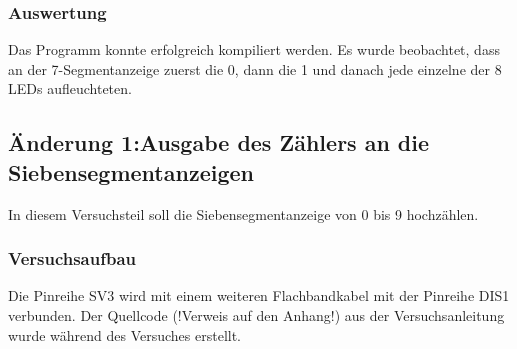 \documentclass[12pt,a4paper]{article}
\begin{document}
\subsubsection*{Auswertung}
Das Programm konnte erfolgreich kompiliert werden. Es wurde beobachtet, dass an der 7-Segmentanzeige zuerst die 0, dann die 1 und danach jede einzelne der 8 LEDs aufleuchteten.
\subsection{Änderung 1:Ausgabe des Zählers an die Siebensegmentanzeigen}
In diesem Versuchsteil soll die Siebensegmentanzeige von 0 bis 9 hochzählen.
\subsubsection*{Versuchsaufbau}
Die Pinreihe SV3 wird mit einem weiteren Flachbandkabel mit der Pinreihe DIS1 verbunden.
Der Quellcode (!Verweis auf den Anhang!) aus der Versuchsanleitung wurde während des Versuches erstellt.
\end{document}
